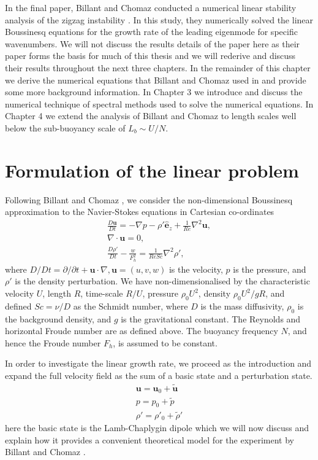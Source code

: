 In the final paper, Billant and Chomaz conducted a numerical linear stability analysis of the zigzag instability \cite{bc2000c}. In this study, they numerically solved the linear Boussinesq equations for the growth rate of the leading eigenmode for specific wavenumbers. We will not discuss the results details of the paper here as their paper forms the basis for much of this thesis and we will rederive and discuss their results throughout the next three chapters. In the remainder of this chapter we derive the numerical equations that Billant and Chomaz used in \cite{bc2000c} and provide some more background information. In Chapter 3 we introduce and discuss the numerical technique of spectral methods used to solve the numerical equations. In Chapter 4 we extend the analysis of Billant and Chomaz to length scales well below the sub-buoyancy scale of $L_{b}\sim U/N$. 

\section{Formulation of the linear problem}
Following Billant and Chomaz \cite{bc2000c}, we consider the non-dimensional Boussinesq approximation to the Navier-Stokes equations in Cartesian co-ordinates 
\begin{align}
\frac{D\bm{u}}{Dt} = -\nabla p - \rho'\hat{\bm{e}}_{z} + \frac{1}{Re}\nabla^{2} \bm{u},\\
\nabla \cdot \bm{u}=0,\\
\frac{D\rho'}{Dt} -\frac{w}{F_{h}^{2}} = \frac{1}{ReSc}\nabla^{2} \rho',
\end{align}
where $D/Dt=\partial/\partial t + \bm{u}\cdot \nabla, \bm{u}=(u,v,w)$ is the velocity, $p$ is the pressure, and $\rho'$ is the density perturbation. We have non-dimensionalised by the characteristic velocity $U$, length $R$, time-scale $R/U$, pressure $\rho_{0}U^{2}$, density $\rho_{0}U^{2}/gR$, and defined $Sc=\nu /D$ as the Schmidt number, where $D$ is the mass diffusivity, $\rho_{0}$ is the background density, and $g$ is the gravitational constant. The Reynolds and horizontal Froude number are as defined above. The buoyancy frequency $N$, and hence the Froude number $F_{h}$, is assumed to be constant. 

In order to investigate the linear growth rate, we proceed as the introduction and expand the full velocity field as the sum of a basic state and a perturbation state. 
\begin{align}
\bm{u} = \bm{u}_{0} + \tilde{\bm{u}}\\
p = p_{0} + \tilde{p}\\
\rho' = \rho'_{0} + \tilde{\rho}' 
\end{align}
here the basic state is the Lamb-Chaplygin dipole which we will now discuss and explain how it provides a convenient theoretical model for the experiment by Billant and Chomaz \cite{bc2000a}.


